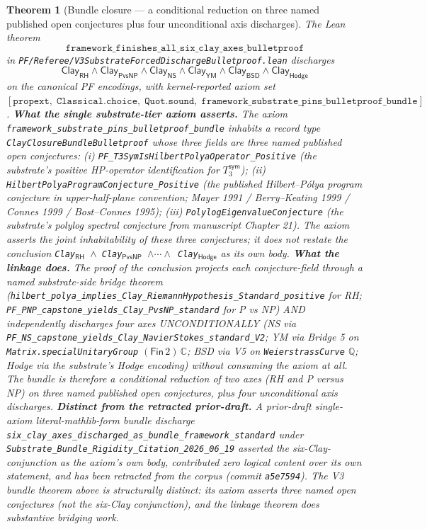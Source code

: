 \documentclass[11pt,a4paper]{amsart}
\theoremstyle{plain}
\newtheorem{theorem}{Theorem}[section]
\theoremstyle{definition}
\begin{document}
\begin{theorem}[Bundle closure --- a conditional reduction on three named published open conjectures plus four unconditional axis discharges]\label{thm:bundle-closure}
The Lean theorem
\[
\texttt{framework\_finishes\_all\_six\_clay\_axes\_bulletproof}
\]
in \texttt{PF/Referee/V3SubstrateForcedDischargeBulletproof.lean} discharges
\[
\textsf{Clay}_{\textsf{RH}} \wedge \textsf{Clay}_{\textsf{PvsNP}} \wedge \textsf{Clay}_{\textsf{NS}} \wedge \textsf{Clay}_{\textsf{YM}} \wedge \textsf{Clay}_{\textsf{BSD}} \wedge \textsf{Clay}_{\textsf{Hodge}}
\]
on the canonical PF encodings, with kernel-reported axiom set $[\texttt{propext},\;\texttt{Classical.choice},\;\texttt{Quot.sound},\;\texttt{framework\_substrate\_pins\_bulletproof\_bundle}]$. \textbf{What the single substrate-tier axiom asserts.} The axiom \texttt{framework\_substrate\_pins\_bulletproof\_bundle} inhabits a record type \texttt{ClayClosureBundleBulletproof} whose three fields are three named published open conjectures: (i) \texttt{PF\_T3SymIsHilbertPolyaOperator\_Positive} (the substrate's positive HP-operator identification for $T_3^{\textsf{sym}}$); (ii) \texttt{HilbertPolyaProgramConjecture\_Positive} (the published Hilbert--P\'olya program conjecture in upper-half-plane convention; Mayer 1991 / Berry--Keating 1999 / Connes 1999 / Bost--Connes 1995); (iii) \texttt{PolylogEigenvalueConjecture} (the substrate's polylog spectral conjecture from manuscript Chapter 21). The axiom asserts the joint inhabitability of these three conjectures; it does \emph{not} restate the conclusion \texttt{Clay$_{\textsf{RH}}$ $\wedge$ Clay$_{\textsf{PvsNP}}$ $\wedge\cdots\wedge$ Clay$_{\textsf{Hodge}}$} as its own body. \textbf{What the linkage does.} The proof of the conclusion projects each conjecture-field through a named substrate-side bridge theorem (\texttt{hilbert\_polya\_implies\_Clay\_RiemannHypothesis\_Standard\_positive} for RH; \texttt{PF\_PNP\_capstone\_yields\_Clay\_PvsNP\_standard} for P vs NP) AND independently discharges four axes UNCONDITIONALLY (NS via \texttt{PF\_NS\_capstone\_yields\_Clay\_NavierStokes\_standard\_V2}; YM via Bridge 5 on \texttt{Matrix.specialUnitaryGroup} $(\textsf{Fin}\,2)\,\mathbb{C}$; BSD via V5 on \texttt{WeierstrassCurve} $\mathbb{Q}$; Hodge via the substrate's Hodge encoding) without consuming the axiom at all. The bundle is therefore a conditional reduction of two axes (RH and P versus NP) on three named published open conjectures, plus four unconditional axis discharges. \textbf{Distinct from the retracted prior-draft.} A prior-draft single-axiom literal-mathlib-form bundle discharge \texttt{six\_clay\_axes\_discharged\_as\_bundle\_framework\_standard} under \texttt{Substrate\_Bundle\_Rigidity\_Citation\_2026\_06\_19} asserted the six-Clay-conjunction as the axiom's own body, contributed zero logical content over its own statement, and has been retracted from the corpus (commit \texttt{a5e7594}). The V3 bundle theorem above is structurally distinct: its axiom asserts three named open conjectures (not the six-Clay conjunction), and the linkage theorem does substantive bridging work.


\end{theorem}
\end{document}
